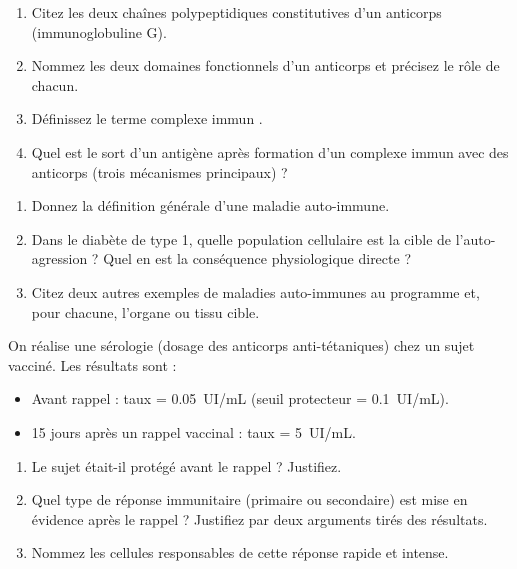 \documentclass[11pt]{article}
\begin{document}
\begin{exercice}
\begin{enumerate}
    \item Citez les deux chaînes polypeptidiques constitutives d'un anticorps (immunoglobuline G).
    \item Nommez les deux domaines fonctionnels d'un anticorps et précisez le rôle de chacun.
    \item Définissez le terme \og complexe immun \fg{}.
    \item Quel est le sort d'un antigène après formation d'un complexe immun avec des anticorps (trois mécanismes principaux) ?
\end{enumerate}
\end{exercice}

\begin{exercice}
\begin{enumerate}
    \item Donnez la définition générale d'une maladie auto-immune.
    \item Dans le diabète de type 1, quelle population cellulaire est la cible de l'auto-agression ? Quel en est la conséquence physiologique directe ?
    \item Citez deux autres exemples de maladies auto-immunes au programme et, pour chacune, l'organe ou tissu cible.
\end{enumerate}
\end{exercice}

\begin{exercice}
On réalise une sérologie (dosage des anticorps anti-tétaniques) chez un sujet vacciné. Les résultats sont :
\begin{itemize}
    \item Avant rappel : taux = \SI{0,05}{UI/mL} (seuil protecteur = \SI{0,1}{UI/mL}).
    \item 15 jours après un rappel vaccinal : taux = \SI{5}{UI/mL}.
\end{itemize}
\begin{enumerate}
    \item Le sujet était-il protégé avant le rappel ? Justifiez.
    \item Quel type de réponse immunitaire (primaire ou secondaire) est mise en évidence après le rappel ? Justifiez par deux arguments tirés des résultats.
    \item Nommez les cellules responsables de cette réponse rapide et intense.
\end{enumerate}
\end{exercice}
\end{document}
